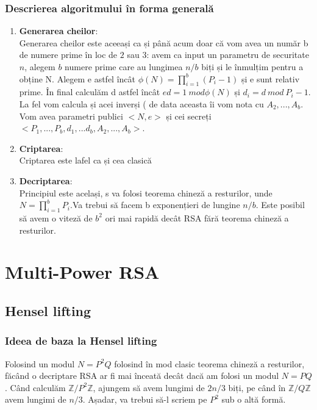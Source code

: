 \documentclass[12]{report}
\begin{document}
		 \subsubsection{Descrierea algoritmului în forma generală}
		 \begin{enumerate}
		 \item \textbf{Generarea cheilor}: \\
		 Generarea cheilor este aceeași ca și până acum doar că vom avea un număr b de numere prime în loc de $2$ sau $3$: avem ca input un parametru de securitate $n$, alegem $b$ numere prime care au lungimea $n/b$ biți și le înmulțim pentru a obține N. Alegem e astfel încât $\phi(N)=\prod_{i=1}^{b}(P_i -1)$ și e sunt relativ prime. În final calculăm d astfel încât $ed=1 \ mod \phi(N)$ și $d_i = d \ mod \ P_i -1$. La fel vom calcula și acei inverși ( de data aceasta îi vom nota cu $A_2,...,A_b$. Vom avea parametri publici $<N,e>$ și cei secreți $<P_1,...,P_b,d_1,...d_b,A_2,...,A_b>$.
		 
		 \item \textbf{Criptarea}: \\
		 Criptarea este lafel ca și cea clasică
		 \item \textbf{Decriptarea}: \\
		 Principiul este același, s va folosi teorema chineză a resturilor, unde $N=\prod_{i=1}^{b} P_i$.Va trebui să facem b exponențieri de lungine $n/b$. Este posibil să avem o viteză de $b^2$ ori mai rapidă decât RSA fără teorema chineză a resturilor.
		 \end{enumerate}
		
		\section{Multi-Power RSA}
		 \subsection{Hensel lifting}
		  \subsubsection{Ideea de baza la Hensel lifting}
		  Folosind un modul $N=P^2Q$ folosind în mod clasic teorema chineză a resturilor, făcând o decriptare RSA ar fi mai înceată decât dacă am folosi un modul $ N=PQ$. Când calculăm $ \mathbb{Z}/P^2\mathbb{Z}$, ajungem să avem lungimi de $2n/3$ biți, pe când în $\mathbb{Z}/Q\mathbb{Z}$ avem lungimi de $n/3$. Așadar, va trebui să-l scriem pe $P^2$ sub o altă formă.
\end{document}
